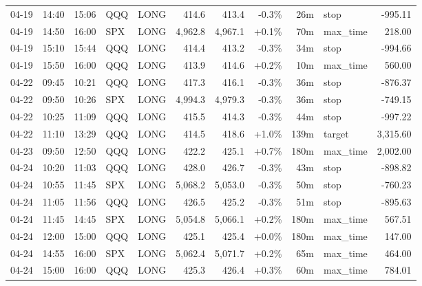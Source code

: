 \documentclass[11pt,a4paper,twoside]{article}
\begin{document}
\begin{center}
\begin{longtable}{>{\color{txtmain}}l l l l l r r r r >{\color{txtmain}}l r}
04-19 & 14:40 & 15:06 & QQQ & LONG & 414.6 & 413.4 & \textcolor{lossred}{-0.3\%} & 26m & stop & \textcolor{lossred}{-995.11} \\
04-19 & 14:50 & 16:00 & SPX & LONG & 4,962.8 & 4,967.1 & \textcolor{wingreen}{+0.1\%} & 70m & max\_time & \textcolor{wingreen}{218.00} \\
04-19 & 15:10 & 15:44 & QQQ & LONG & 414.4 & 413.2 & \textcolor{lossred}{-0.3\%} & 34m & stop & \textcolor{lossred}{-994.66} \\
04-19 & 15:50 & 16:00 & QQQ & LONG & 413.9 & 414.6 & \textcolor{wingreen}{+0.2\%} & 10m & max\_time & \textcolor{wingreen}{560.00} \\
04-22 & 09:45 & 10:21 & QQQ & LONG & 417.3 & 416.1 & \textcolor{lossred}{-0.3\%} & 36m & stop & \textcolor{lossred}{-876.37} \\
04-22 & 09:50 & 10:26 & SPX & LONG & 4,994.3 & 4,979.3 & \textcolor{lossred}{-0.3\%} & 36m & stop & \textcolor{lossred}{-749.15} \\
04-22 & 10:25 & 11:09 & QQQ & LONG & 415.5 & 414.3 & \textcolor{lossred}{-0.3\%} & 44m & stop & \textcolor{lossred}{-997.22} \\
04-22 & 11:10 & 13:29 & QQQ & LONG & 414.5 & 418.6 & \textcolor{wingreen}{+1.0\%} & 139m & target & \textcolor{wingreen}{3,315.60} \\
04-23 & 09:50 & 12:50 & QQQ & LONG & 422.2 & 425.1 & \textcolor{wingreen}{+0.7\%} & 180m & max\_time & \textcolor{wingreen}{2,002.00} \\
04-24 & 10:20 & 11:03 & QQQ & LONG & 428.0 & 426.7 & \textcolor{lossred}{-0.3\%} & 43m & stop & \textcolor{lossred}{-898.82} \\
04-24 & 10:55 & 11:45 & SPX & LONG & 5,068.2 & 5,053.0 & \textcolor{lossred}{-0.3\%} & 50m & stop & \textcolor{lossred}{-760.23} \\
04-24 & 11:05 & 11:56 & QQQ & LONG & 426.5 & 425.2 & \textcolor{lossred}{-0.3\%} & 51m & stop & \textcolor{lossred}{-895.63} \\
04-24 & 11:45 & 14:45 & SPX & LONG & 5,054.8 & 5,066.1 & \textcolor{wingreen}{+0.2\%} & 180m & max\_time & \textcolor{wingreen}{567.51} \\
04-24 & 12:00 & 15:00 & QQQ & LONG & 425.1 & 425.4 & \textcolor{wingreen}{+0.0\%} & 180m & max\_time & \textcolor{wingreen}{147.00} \\
04-24 & 14:55 & 16:00 & SPX & LONG & 5,062.4 & 5,071.7 & \textcolor{wingreen}{+0.2\%} & 65m & max\_time & \textcolor{wingreen}{464.00} \\
04-24 & 15:00 & 16:00 & QQQ & LONG & 425.3 & 426.4 & \textcolor{wingreen}{+0.3\%} & 60m & max\_time & \textcolor{wingreen}{784.01} \\

\end{longtable}
\end{center}
\end{document}
